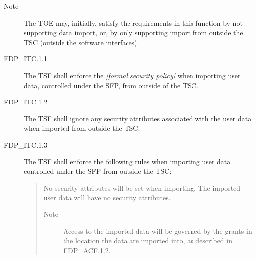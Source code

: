 \documentclass[12pt,english]{scrbook}
\begin{document}
\begin{description}
\item[Note]

The TOE may, initially, satisfy the requirements in this
function by not supporting data import, or, by only
supporting import from outside the TSC (outside the
software interfaces).

\item[FDP{\_}ITC.1.1]

The TSF shall enforce the \emph{{[}formal security policy]} when importing user 
data, controlled under the SFP, from outside of the TSC.

\item[FDP{\_}ITC.1.2]

The TSF shall ignore any security attributes associated with the user data 
when imported from outside the TSC.

\item[FDP{\_}ITC.1.3]

The TSF shall enforce the following rules when importing user data 
controlled under the SFP from outside the TSC:
\begin{quote}

No security attributes will be set when importing. The imported
user data will have no security attributes.
\begin{description}
\item[Note]

Access to the imported data will be governed by the grants in
the location the data are imported into, as described in
FDP{\_}ACF.1.2.

\end{description}
\end{quote}

\end{description}


\end{document}
